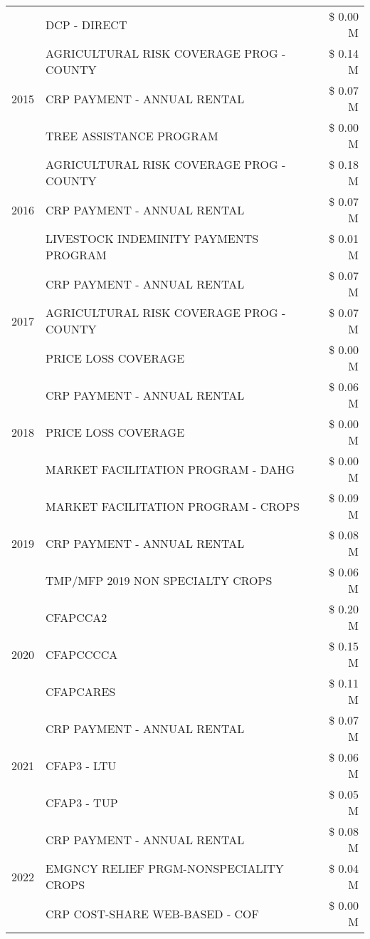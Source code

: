 \begin{tabular}{llr}
 & DCP - DIRECT & \$ 0.00 M \\
\cline{1-3}
\multirow[t]{3}{*}{2015} & AGRICULTURAL RISK COVERAGE PROG - COUNTY & \$ 0.14 M \\
 & CRP PAYMENT - ANNUAL RENTAL & \$ 0.07 M \\
 & TREE ASSISTANCE PROGRAM & \$ 0.00 M \\
\cline{1-3}
\multirow[t]{3}{*}{2016} & AGRICULTURAL RISK COVERAGE PROG - COUNTY & \$ 0.18 M \\
 & CRP PAYMENT - ANNUAL RENTAL & \$ 0.07 M \\
 & LIVESTOCK INDEMINITY PAYMENTS PROGRAM & \$ 0.01 M \\
\cline{1-3}
\multirow[t]{3}{*}{2017} & CRP PAYMENT - ANNUAL RENTAL & \$ 0.07 M \\
 & AGRICULTURAL RISK COVERAGE PROG - COUNTY & \$ 0.07 M \\
 & PRICE LOSS COVERAGE & \$ 0.00 M \\
\cline{1-3}
\multirow[t]{3}{*}{2018} & CRP PAYMENT - ANNUAL RENTAL & \$ 0.06 M \\
 & PRICE LOSS COVERAGE & \$ 0.00 M \\
 & MARKET FACILITATION PROGRAM - DAHG & \$ 0.00 M \\
\cline{1-3}
\multirow[t]{3}{*}{2019} & MARKET FACILITATION PROGRAM - CROPS & \$ 0.09 M \\
 & CRP PAYMENT - ANNUAL RENTAL & \$ 0.08 M \\
 & TMP/MFP 2019 NON SPECIALTY CROPS & \$ 0.06 M \\
\cline{1-3}
\multirow[t]{3}{*}{2020} & CFAPCCA2 & \$ 0.20 M \\
 & CFAPCCCCA & \$ 0.15 M \\
 & CFAPCARES & \$ 0.11 M \\
\cline{1-3}
\multirow[t]{3}{*}{2021} & CRP PAYMENT - ANNUAL RENTAL & \$ 0.07 M \\
 & CFAP3 - LTU & \$ 0.06 M \\
 & CFAP3 - TUP & \$ 0.05 M \\
\cline{1-3}
\multirow[t]{3}{*}{2022} & CRP PAYMENT - ANNUAL RENTAL & \$ 0.08 M \\
 & EMGNCY RELIEF PRGM-NONSPECIALITY CROPS & \$ 0.04 M \\
 & CRP COST-SHARE WEB-BASED - COF & \$ 0.00 M \\
\cline{1-3}
\bottomrule
\end{tabular}
